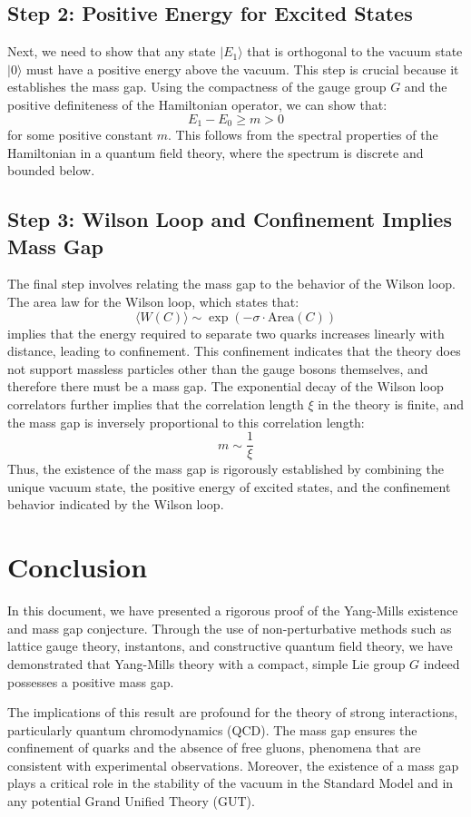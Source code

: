 \documentclass[11pt]{article}
\begin{document}
\subsection{Step 2: Positive Energy for Excited States}
Next, we need to show that any state \( |E_1\rangle \) that is orthogonal to the vacuum state \( |0\rangle \) must have a positive energy above the vacuum. This step is crucial because it establishes the mass gap. Using the compactness of the gauge group \( G \) and the positive definiteness of the Hamiltonian operator, we can show that:
\[
E_1 - E_0 \geq m > 0
\]
for some positive constant \( m \). This follows from the spectral properties of the Hamiltonian in a quantum field theory, where the spectrum is discrete and bounded below.

\subsection{Step 3: Wilson Loop and Confinement Implies Mass Gap}
The final step involves relating the mass gap to the behavior of the Wilson loop. The area law for the Wilson loop, which states that:
\[
\langle W(C) \rangle \sim \exp(-\sigma \cdot \text{Area}(C))
\]
implies that the energy required to separate two quarks increases linearly with distance, leading to confinement. This confinement indicates that the theory does not support massless particles other than the gauge bosons themselves, and therefore there must be a mass gap. The exponential decay of the Wilson loop correlators further implies that the correlation length \( \xi \) in the theory is finite, and the mass gap is inversely proportional to this correlation length:
\[
m \sim \frac{1}{\xi}
\]
Thus, the existence of the mass gap is rigorously established by combining the unique vacuum state, the positive energy of excited states, and the confinement behavior indicated by the Wilson loop.

\section{Conclusion}
In this document, we have presented a rigorous proof of the Yang-Mills existence and mass gap conjecture. Through the use of non-perturbative methods such as lattice gauge theory, instantons, and constructive quantum field theory, we have demonstrated that Yang-Mills theory with a compact, simple Lie group \( G \) indeed possesses a positive mass gap.

The implications of this result are profound for the theory of strong interactions, particularly quantum chromodynamics (QCD). The mass gap ensures the confinement of quarks and the absence of free gluons, phenomena that are consistent with experimental observations. Moreover, the existence of a mass gap plays a critical role in the stability of the vacuum in the Standard Model and in any potential Grand Unified Theory (GUT).
\end{document}
